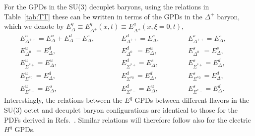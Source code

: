 \documentclass[preprintnumbers,prd,superscriptaddress,preprint]{revtex4-1}
\begin{document}
%
For the GPDs in the SU(3) decuplet baryons, using the relations in Table~\ref{tab:TT} these can be written in terms of the GPDs in the $\Delta^+$ baryon, which we denote by $E^q_\Delta \equiv E^q_{\Delta^+}(x,t) \equiv E^q_{\Delta^+}(x,\xi=0,t)$,
%
\begin{subequations}
\begin{alignat}{3}
 & E^u_{\Delta^{++}}\!= E^u_{\Delta} + E^d_{\Delta}- E^s_{\Delta},~~~~~~~~~~
&& E^d_{\Delta^{++}}\!= E^s_{\Delta},~~~~~~~~~~~
&& E^s_{\Delta^{++}}\!= E^s_{\Delta},~~~~~~~~~~~
\\
 & E^u_{\Delta^{0}}\,\: = E^d_{\Delta},
&& E^d_{\Delta^{0}}\,\: = E^u_{\Delta},
&& E^s_{\Delta^{0}}\,\: = E^s_{\Delta},
\\
 & E^u_{\Sigma^{*+}} = E^u_{\Delta},
&& E^d_{\Sigma^{*+}} = E^s_{\Delta},
&& E^s_{\Sigma^{*+}} = E^d_{\Delta},
\\
 & E^u_{\Sigma^{*0}}\, = E^d_{\Delta},
&& E^d_{\Sigma^{*0}}\, = E^d_{\Delta},
&& E^s_{\Sigma^{*0}}\, = E^d_{\Delta},
\\
 & E^u_{\Sigma^{*-}} = E^s_{\Delta},
&& E^d_{\Sigma^{*-}} = E^u_{\Delta},
&& E^s_{\Sigma^{*-}} = E^d_{\Delta}.
\end{alignat}
\end{subequations}
%
Interestingly, the relations between the $E^q$ GPDs between different flavors in the SU(3) octet and decuplet baryon configurations are identical to those for the PDFs derived in Refs.~\cite{Wang:2016ndh, Salamu:2019dok}.
Similar relations will therefore follow also for the electric $H^q$ GPDs.
\end{document}
